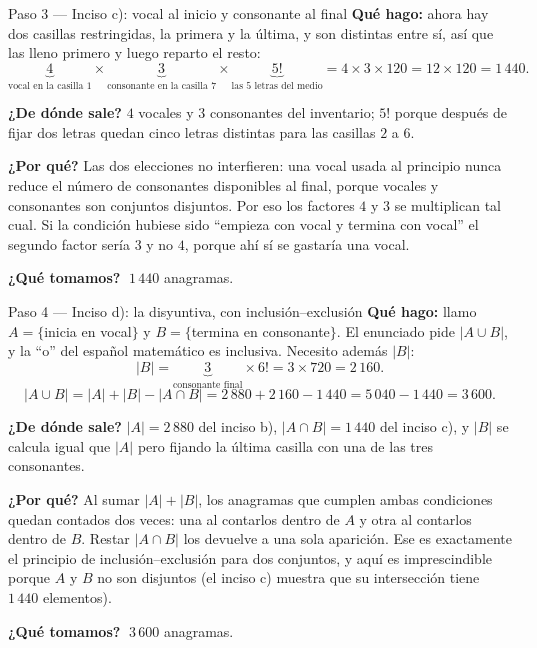 \documentclass[11pt]{article}
\begin{document}
\begin{paso}{Paso 3 --- Inciso c): vocal al inicio y consonante al final}
\textbf{Qué hago:} ahora hay dos casillas restringidas, la primera y la última, y son distintas entre sí,
así que las lleno primero y luego reparto el resto:
\[
\underbrace{4}_{\text{vocal en la casilla 1}}\times\underbrace{3}_{\text{consonante en la casilla 7}}\times\underbrace{5!}_{\text{las 5 letras del medio}}
=4\times3\times120=12\times120=1\,440 .
\]

\textbf{¿De dónde sale?} $4$ vocales y $3$ consonantes del inventario; $5!$ porque después de fijar dos
letras quedan cinco letras distintas para las casillas $2$ a $6$.

\textbf{¿Por qué?} Las dos elecciones no interfieren: una vocal usada al principio nunca reduce el número
de consonantes disponibles al final, porque vocales y consonantes son conjuntos disjuntos. Por eso los
factores $4$ y $3$ se multiplican tal cual. Si la condición hubiese sido ``empieza con vocal y termina con
vocal'' el segundo factor sería $3$ y no $4$, porque ahí sí se gastaría una vocal.

\textbf{¿Qué tomamos?} $\;1\,440$ anagramas.
\end{paso}

\begin{paso}{Paso 4 --- Inciso d): la disyuntiva, con inclusión--exclusión}
\textbf{Qué hago:} llamo $A=\{$inicia en vocal$\}$ y $B=\{$termina en consonante$\}$. El enunciado pide
$|A\cup B|$, y la ``o'' del español matemático es inclusiva. Necesito además $|B|$:
\[
|B|=\underbrace{3}_{\text{consonante final}}\times 6!=3\times720=2\,160 .
\]
\[
|A\cup B|=|A|+|B|-|A\cap B|=2\,880+2\,160-1\,440=5\,040-1\,440=3\,600 .
\]

\textbf{¿De dónde sale?} $|A|=2\,880$ del inciso b), $|A\cap B|=1\,440$ del inciso c), y $|B|$ se calcula
igual que $|A|$ pero fijando la última casilla con una de las tres consonantes.

\textbf{¿Por qué?} Al sumar $|A|+|B|$, los anagramas que cumplen ambas condiciones quedan contados dos
veces: una al contarlos dentro de $A$ y otra al contarlos dentro de $B$. Restar $|A\cap B|$ los devuelve a
una sola aparición. Ese es exactamente el principio de inclusión--exclusión para dos conjuntos, y aquí es
imprescindible porque $A$ y $B$ no son disjuntos (el inciso c) muestra que su intersección tiene
$1\,440$ elementos).

\textbf{¿Qué tomamos?} $\;3\,600$ anagramas.
\end{paso}
\end{document}
